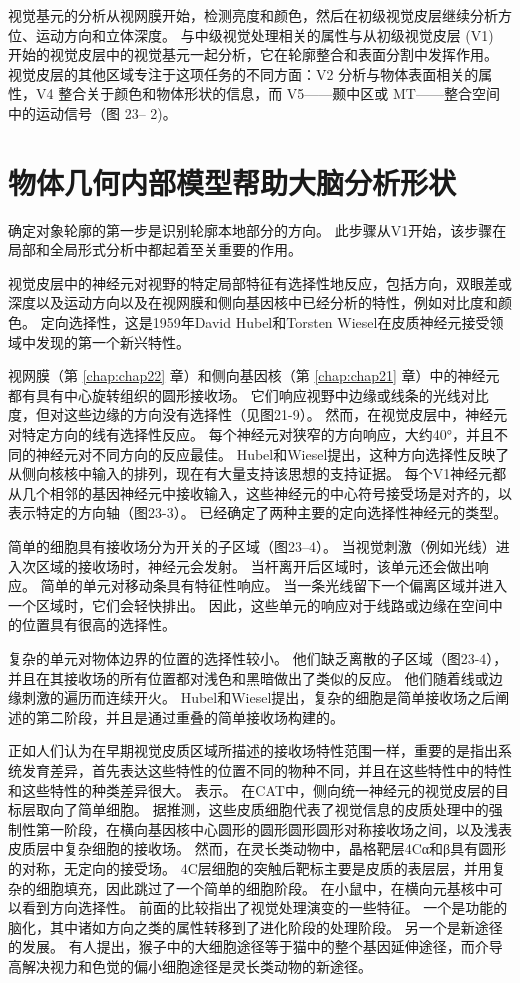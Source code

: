 视觉基元的分析从视网膜开始，检测亮度和颜色，然后在初级视觉皮层继续分析方位、运动方向和立体深度。
与中级视觉处理相关的属性与从初级视觉皮层 (V1) 开始的视觉皮层中的视觉基元一起分析，它在轮廓整合和表面分割中发挥作用。
视觉皮层的其他区域专注于这项任务的不同方面：V2 分析与物体表面相关的属性，V4 整合关于颜色和物体形状的信息，而 V5——颞中区或 MT——整合空间中的运动信号（图 23– 2)。


\section{物体几何内部模型帮助大脑分析形状}

确定对象轮廓的第一步是识别轮廓本地部分的方向。
此步骤从V1开始，该步骤在局部和全局形式分析中都起着至关重要的作用。


视觉皮层中的神经元对视野的特定局部特征有选择性地反应，包括方向，双眼差或深度以及运动方向以及在视网膜和侧向基因核中已经分析的特性，例如对比度和颜色。 
定向选择性，这是1959年David Hubel和Torsten Wiesel在皮质神经元接受领域中发现的第一个新兴特性。


视网膜（第  \ref{chap:chap22} 章）和侧向基因核（第 \ref{chap:chap21} 章）中的神经元都有具有中心旋转组织的圆形接收场。 
它们响应视野中边缘或线条的光线对比度，但对这些边缘的方向没有选择性（见图21-9）。 
然而，在视觉皮层中，神经元对特定方向的线有选择性反应。 每个神经元对狭窄的方向响应，大约40°，并且不同的神经元对不同方向的反应最佳。 
Hubel和Wiesel提出，这种方向选择性反映了从侧向核核中输入的排列，现在有大量支持该思想的支持证据。 
每个V1神经元都从几个相邻的基因神经元中接收输入，这些神经元的中心符号接受场是对齐的，以表示特定的方向轴（图23-3）。 
已经确定了两种主要的定向选择性神经元的类型。


简单的细胞具有接收场分为开关的子区域（图23–4）。 当视觉刺激（例如光线）进入次区域的接收场时，神经元会发射。 
当杆离开后区域时，该单元还会做出响应。 
简单的单元对移动条具有特征性响应。 
当一条光线留下一个偏离区域并进入一个区域时，它们会轻快排出。 
因此，这些单元的响应对于线路或边缘在空间中的位置具有很高的选择性。


复杂的单元对物体边界的位置的选择性较小。 
他们缺乏离散的子区域（图23-4），并且在其接收场的所有位置都对浅色和黑暗做出了类似的反应。 
他们随着线或边缘刺激的遍历而连续开火。 
Hubel和Wiesel提出，复杂的细胞是简单接收场之后阐述的第二阶段，并且是通过重叠的简单接收场构建的。


正如人们认为在早期视觉皮质区域所描述的接收场特性范围一样，重要的是指出系统发育差异，首先表达这些特性的位置不同的物种不同，并且在这些特性中的特性和这些特性的种类差异很大。 表示。 
在CAT中，侧向统一神经元的视觉皮层的目标层取向了简单细胞。 
据推测，这些皮质细胞代表了视觉信息的皮质处理中的强制性第一阶段，在横向基因核中心圆形的圆形圆形圆形对称接收场之间，以及浅表皮质层中复杂细胞的接收场。 
然而，在灵长类动物中，晶格靶层4Cα和β具有圆形的对称，无定向的接受场。 
4C层细胞的突触后靶标主要是皮质的表层层，并用复杂的细胞填充，因此跳过了一个简单的细胞阶段。 
在小鼠中，在横向元基核中可以看到方向选择性。 
前面的比较指出了视觉处理演变的一些特征。 
一个是功能的脑化，其中诸如方向之类的属性转移到了进化阶段的处理阶段。 
另一个是新途径的发展。 
有人提出，猴子中的大细胞途径等于猫中的整个基因延伸途径，而介导高解决视力和色觉的偏小细胞途径是灵长类动物的新途径。


